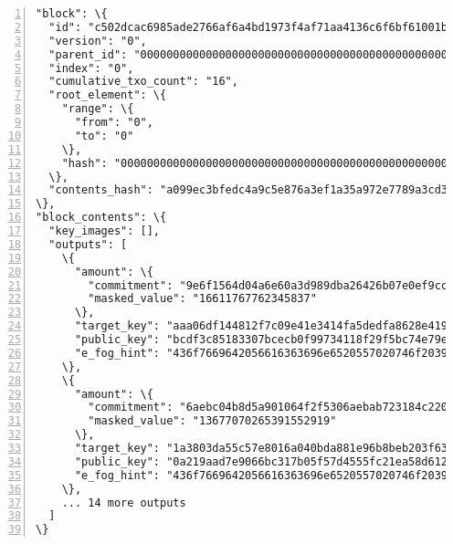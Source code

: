 \begin{appendices}
\begin{Verbatim}[commandchars=\\\{\}, numbers=left]
"block": \{
  "id": "c502dcac6985ade2766af6a4bd1973f4af71aa4136c6f6bf61001b21e5ddf9ae",
  "version": "0",
  "parent_id": "0000000000000000000000000000000000000000000000000000000000000000",
  "index": "0",
  "cumulative_txo_count": "16",
  "root_element": \{
    "range": \{
      "from": "0",
      "to": "0"
    \},
    "hash": "0000000000000000000000000000000000000000000000000000000000000000"
  \},
  "contents_hash": "a099ec3bfedc4a9c5e876a3ef1a35a972e7789a3cd35a4b842094c517d631531"
\},
"block_contents": \{
  "key_images": [],
  "outputs": [
    \{
      "amount": \{
        "commitment": "9e6f1564d04a6e60a3d989dba26426b07e0ef9cc1e63915e538fd06ba56b0558",
        "masked_value": "16611767762345837"
      \},
      "target_key": "aaa06df144812f7c09e41e3414fa5dedfa8628e41981880c36d13c5e58cac11e",
      "public_key": "bcdf3c85183307bcecb0f99734118f29f5bc74e79eae44bd577606de9f129405",
      "e_fog_hint": "436f7669642056616363696e6520557020746f20393[...]3066633431373535"
    \},
    \{
      "amount": \{
        "commitment": "6aebc04b8d5a901064f2f5306aebab723184c22041e8b6552310825c8857ed14",
        "masked_value": "13677070265391552919"
      \},
      "target_key": "1a3803da55c57e8016a040bda881e96b8beb203f631df57562ac873b24eec301",
      "public_key": "0a219aad7e9066bc317b05f57d4555fc21ea58d61255c3e128b61cae5ed4545f",
      "e_fog_hint": "436f7669642056616363696e6520557020746f20393[...]3066633431373535"
    \},
    ... 14 more outputs
  ]
\}
\end{Verbatim}

\end{appendices}